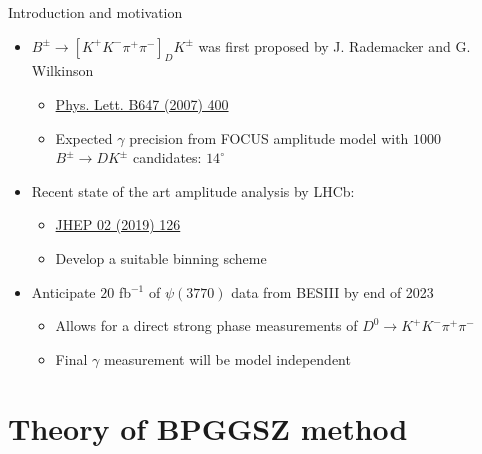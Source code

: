\documentclass{beamer}
\begin{document}
\begin{frame}{Introduction and motivation}
  \vspace{0.5cm}
  \begin{itemize}
    \setlength\itemsep{1.5em}
    \item{$B^\pm\to[K^+K^-\pi^+\pi^-]_D K^\pm$ was first proposed by J. Rademacker and G. Wilkinson}
    \begin{itemize}
      \item{\href{https://arxiv.org/abs/hep-ph/0611272}{Phys. Lett. B647 (2007) 400}}
      \item{Expected $\gamma$ precision from FOCUS amplitude model with $1000$ $B^\pm\to DK^\pm$ candidates: $14^\circ$}
    \end{itemize}
    \item{Recent state of the art amplitude analysis by LHCb:}
    \begin{itemize}
      \item{\href{https://arxiv.org/abs/1811.08304}{JHEP 02 (2019) 126}}
      \item{Develop a suitable binning scheme}
    \end{itemize}
    \item{Anticipate $20$ fb$^{-1}$ of $\psi(3770)$ data from BESIII by end of 2023}
    \begin{itemize}
      \item{Allows for a direct strong phase measurements of $D^0\to K^+K^-\pi^+\pi^-$}
      \item{Final $\gamma$ measurement will be model independent}
    \end{itemize}
  \end{itemize}
\end{frame}

\section{Theory of BPGGSZ method}
\end{document}
